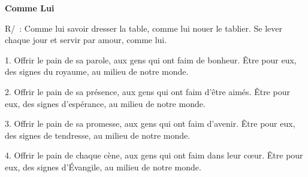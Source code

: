 \textbf{Comme Lui}

R/ : Comme lui savoir dresser la table, comme lui nouer le tablier.
       Se lever chaque jour et servir par amour, comme lui.

1.    Offrir le pain de sa parole, aux gens qui ont faim de bonheur.
       Être pour eux, des signes du royaume, au milieu de notre monde.

2.    Offrir le pain de sa présence, aux gens qui ont faim d’être aimés.
       Être pour eux, des signes d’espérance, au milieu de notre monde.

3.    Offrir le pain de sa promesse, aux gens qui ont faim d’avenir.
       Être pour eux, des signes de tendresse, au milieu de notre monde.

4.    Offrir le pain de chaque cène, aux gens qui ont faim dans leur cœur.
       Être pour eux, des signes d’Évangile, au milieu de notre monde.

